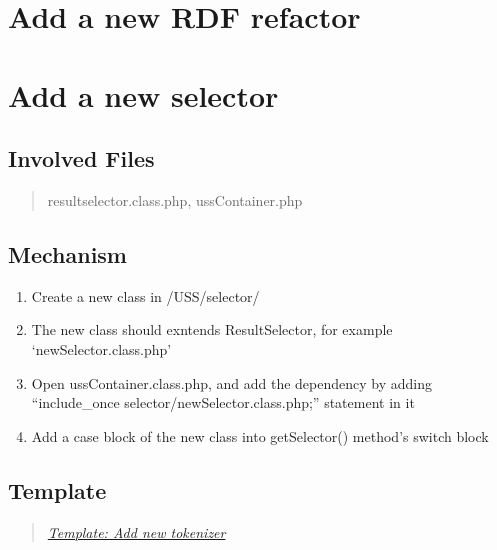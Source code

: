 \documentclass[letterpaper,10pt,english]{sphinxmanual}
\begin{document}
\section{Add a new RDF refactor}
\label{docs/hooks/new_refactor:add-a-new-rdf-refactor}\label{docs/hooks/new_refactor::doc}

\section{Add a new selector}
\label{docs/hooks/new_selector:hook-selector}\label{docs/hooks/new_selector::doc}\label{docs/hooks/new_selector:add-a-new-selector}

\subsection{Involved Files}
\label{docs/hooks/new_selector:involved-files}\begin{quote}

resultselector.class.php, ussContainer.php
\end{quote}


\subsection{Mechanism}
\label{docs/hooks/new_selector:mechanism}\begin{enumerate}
\item {} 
Create a new class in /USS/selector/

\item {} 
The new class should exntends ResultSelector, for example `newSelector.class.php'

\item {} 
Open ussContainer.class.php, and add the dependency by adding ``include\_once selector/newSelector.class.php;'' statement in it

\item {} 
Add a case block of the new class into getSelector() method's switch block

\end{enumerate}


\subsection{Template}
\label{docs/hooks/new_selector:template}\begin{quote}

{\hyperref[docs/hooks/t_tokenizer:hook-template-uss]{\emph{Template: Add new tokenizer}}}
\end{quote}
\end{document}
